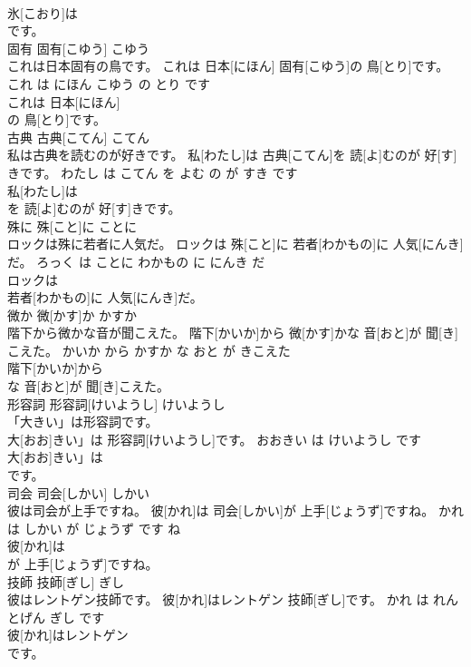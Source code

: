 \documentclass[8pt]{extreport}
\begin{document}
\begin{CJK}{UTF8}{min}
\\	氷[こおり]は
\\	です。			
\\	固有	固有[こゆう]	こゆう	
\\	これは日本固有の鳥です。	これは 日本[にほん] 固有[こゆう]の 鳥[とり]です。	これ は にほん こゆう の とり です	
\\	これは 日本[にほん]
\\	の 鳥[とり]です。			
\\	古典	古典[こてん]	こてん	
\\	私は古典を読むのが好きです。	私[わたし]は 古典[こてん]を 読[よ]むのが 好[す]きです。	わたし は こてん を よむ の が すき です	
\\	私[わたし]は
\\	を 読[よ]むのが 好[す]きです。			
\\	殊に	殊[こと]に	ことに	
\\	ロックは殊に若者に人気だ。	ロックは 殊[こと]に 若者[わかもの]に 人気[にんき]だ。	ろっく は ことに わかもの に にんき だ	
\\	ロックは
\\	若者[わかもの]に 人気[にんき]だ。			
\\	微か	微[かす]か	かすか	
\\	階下から微かな音が聞こえた。	階下[かいか]から 微[かす]かな 音[おと]が 聞[き]こえた。	かいか から かすか な おと が きこえた	
\\	階下[かいか]から
\\	な 音[おと]が 聞[き]こえた。			
\\	形容詞	形容詞[けいようし]	けいようし	
\\	「大きい」は形容詞です。	
\\	大[おお]きい」は 形容詞[けいようし]です。	おおきい は けいようし です	
\\	大[おお]きい」は
\\	です。			
\\	司会	司会[しかい]	しかい	
\\	彼は司会が上手ですね。	彼[かれ]は 司会[しかい]が 上手[じょうず]ですね。	かれ は しかい が じょうず です ね	
\\	彼[かれ]は
\\	が 上手[じょうず]ですね。			
\\	技師	技師[ぎし]	ぎし	
\\	彼はレントゲン技師です。	彼[かれ]はレントゲン 技師[ぎし]です。	かれ は れんとげん ぎし です	
\\	彼[かれ]はレントゲン
\\	です。			

\end{CJK}
\end{document}
